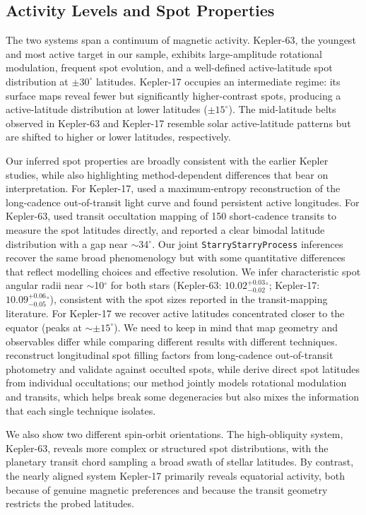 \documentclass[twocolumn]{aastex631}
\begin{document}
\subsection{Activity Levels and Spot Properties}
The two systems span a continuum of magnetic activity. Kepler-63, the youngest and most active
target in our sample, exhibits large-amplitude rotational modulation, frequent spot evolution, and
a well-defined active-latitude spot distribution at $\pm30^\circ$ latitudes. Kepler-17 occupies an intermediate regime: 
its surface maps reveal
fewer but significantly higher-contrast spots, producing a active-latitude distribution at lower latitudes
($\pm15^\circ$). The mid-latitude belts observed in Kepler-63 and
Kepler-17 resemble solar active-latitude patterns but are shifted to higher or lower latitudes,
respectively. 

Our inferred spot properties are broadly consistent with the earlier Kepler studies, 
while also highlighting method-dependent differences that bear on interpretation.  
For Kepler-17, \cite{Lanza2019} used a maximum-entropy reconstruction of the long-cadence 
out-of-transit light curve and found persistent active longitudes.
For Kepler-63, \cite{Netto2019} used transit occultation mapping of 150 short-cadence transits 
to measure the spot latitudes directly, and reported a clear bimodal latitude distribution 
with a gap near $\sim$34$^\circ$.
Our joint \texttt{StarryStarryProcess} inferences recover the same broad phenomenology 
but with some quantitative differences that reflect modelling choices and effective resolution. 
We infer characteristic spot angular radii near $\sim$10$^\circ$ for both stars 
(Kepler-63: $10.02^{+0.03}_{-0.02}{}^\circ$; Kepler-17: $10.09^{+0.06}_{-0.05}{}^\circ$), consistent with 
the spot sizes reported in the transit-mapping literature. For Kepler-17 we recover active latitudes concentrated closer to the equator (peaks at $\sim\pm15^\circ$).
We need to keep in mind that map geometry and observables differ while comparing different results with
different techniques. \cite{Lanza2019} reconstruct longitudinal spot filling factors from 
long-cadence out-of-transit photometry and validate against occulted spots, while \cite{Netto2019} 
derive direct spot latitudes from individual occultations; our method jointly models rotational modulation and transits, 
which helps break some degeneracies but also mixes the information that each single technique isolates.

We also show two different spin-orbit orientations. The high-obliquity system, Kepler-63, reveals more 
complex or structured spot distributions, with the
planetary transit chord sampling a broad swath of stellar latitudes. By contrast, the nearly aligned system Kepler-17 
primarily reveals equatorial activity, both because of genuine magnetic preferences and
because the transit geometry restricts the probed latitudes. 
\end{document}
